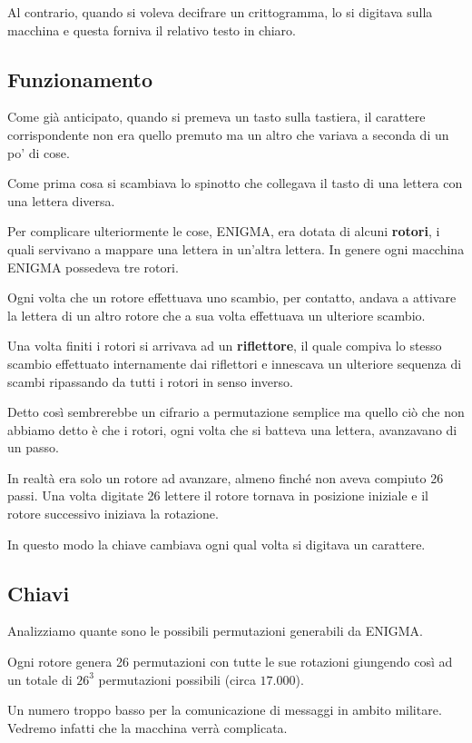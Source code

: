 Al contrario, quando si voleva decifrare un crittogramma, lo si digitava sulla macchina e questa forniva il relativo testo
in chiaro.

\subsection{Funzionamento}
Come gi\`a anticipato, quando si premeva un tasto sulla tastiera, il carattere corrispondente non era quello premuto ma
un altro che variava a seconda di un po' di cose.

Come prima cosa si scambiava lo spinotto che collegava il tasto di una lettera con una lettera diversa.

Per complicare ulteriormente le cose, ENIGMA, era dotata di alcuni \textbf{rotori}, i quali servivano a mappare una
lettera in un'altra lettera. In genere ogni macchina ENIGMA possedeva tre rotori.

Ogni volta che un rotore effettuava uno scambio, per contatto, andava a attivare la lettera di un altro rotore che a sua
volta effettuava un ulteriore scambio.

Una volta finiti i rotori si arrivava ad un \textbf{riflettore}, il quale compiva lo stesso scambio effettuato internamente
dai riflettori e innescava un ulteriore sequenza di scambi ripassando da tutti i rotori in senso inverso.

Detto cos\`i sembrerebbe un cifrario a permutazione semplice ma quello ci\`o che non abbiamo detto \`e che i rotori, ogni
volta che si batteva una lettera, avanzavano di un passo.

In realt\`a era solo un rotore ad avanzare, almeno finch\'e non aveva compiuto 26 passi. Una volta digitate 26 lettere
il rotore tornava in posizione iniziale e il rotore successivo iniziava la rotazione.

In questo modo la chiave cambiava ogni qual volta si digitava un carattere.

\subsection{Chiavi}
Analizziamo quante sono le possibili permutazioni generabili da ENIGMA.

Ogni rotore genera 26 permutazioni con tutte le sue rotazioni giungendo cos\`i ad un totale di $26^3$ permutazioni
possibili (circa $17.000$).

Un numero troppo basso per la comunicazione di messaggi in ambito militare. Vedremo infatti che la macchina verr\`a
complicata.

